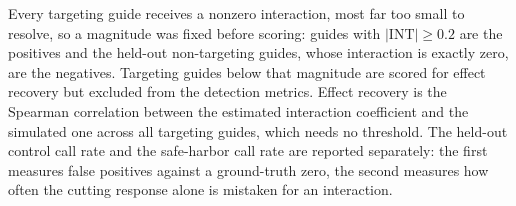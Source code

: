 Every targeting guide receives a nonzero interaction, most far too small to
resolve, so a magnitude was fixed before scoring: guides with
$\lvert\mathrm{INT}\rvert\geq0.2$ are the positives and the held-out
non-targeting guides, whose interaction is exactly zero, are the negatives.
Targeting guides below that magnitude are scored for effect recovery but
excluded from the detection metrics.  Effect recovery is the Spearman
correlation between the estimated interaction coefficient and the simulated
one across all targeting guides, which needs no threshold.  The held-out
control call rate and the safe-harbor call rate are reported separately: the
first measures false positives against a ground-truth zero, the second
measures how often the cutting response alone is mistaken for an interaction.
